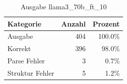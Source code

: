 
\begin{table}[!ht]
\centering
\begin{tabular}{lrr}
\toprule
\textbf{Kategorie} & \textbf{Anzahl} & \textbf{Prozent} \\
\midrule
Ausgabe & 404 & 100.0\% \\
Korrekt & 396 & 98.0\% \\
Parse Fehler & 3 & 0.7\% \\
Struktur Fehler & 5 & 1.2\% \\
\bottomrule
\end{tabular}
\caption{Ausgabe llama3_70b_ft_10}
\label{tab:file_counts}
\end{table}
    